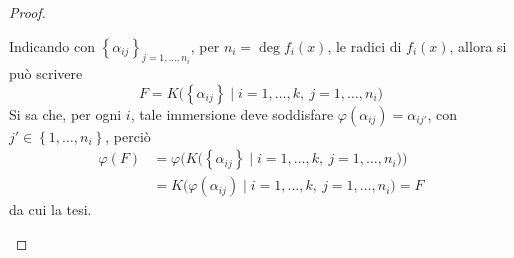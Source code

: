 \documentclass[12pt]{scrartcl}
\theoremstyle{style}
\numberwithin{equation}{subsection}
\begin{document}
\begin{proof}
\begin{itemize}
	Indicando con $\left\{ \alpha _{ij}  \right\} _{j=1,\ldots,n_i} $, per $n_i = \deg f_i(x)$, le radici di $f_i(x)$, allora si pu\`o scrivere 
	\[
	F = K\big(\left\{ \alpha _{ij}  \right\}  \mid i=1,\ldots, k, \ j = 1,\ldots, n_i\big)
	\] 
	Si sa che, per ogni $i$, tale immersione deve soddisfare $\varphi (\alpha _{ij} ) = \alpha _{ij'} $, con $j' \in \left\{ 1,\ldots,n_i \right\} $, perci\`o
	\[
		\begin{split}
			\varphi (F) &= \varphi \Big( K\big(\left\{ \alpha _{ij}  \right\}  \mid i=1,\ldots, k, \ j = 1,\ldots, n_i\big) \Big)\\
				    &= K\big(\varphi (\alpha _{ij} )  \mid i=1,\ldots,k, \ j=1,\ldots,n_i\big) = F
		\end{split}
	\] 
	da cui la tesi.
	\end{itemize}
\end{proof}
\end{document}
